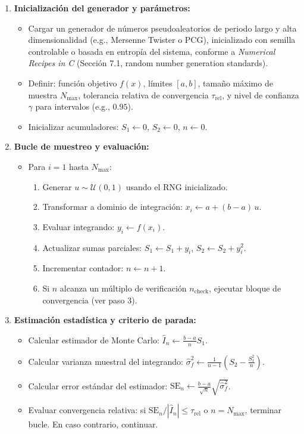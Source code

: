 \documentclass[12pt]{article}
\begin{document}
\begin{enumerate}
\item \textbf{Inicialización del generador y parámetros:}
\begin{itemize}
\item Cargar un generador de números pseudoaleatorios de periodo largo y alta dimensionalidad (e.g., Mersenne Twister o PCG), inicializado con semilla controlable o basada en entropía del sistema, conforme a \textit{Numerical Recipes in C} (Sección 7.1, random number generation standards).
\item Definir: función objetivo $f(x)$, límites $[a,b]$, tamaño máximo de muestra $N_{\max}$, tolerancia relativa de convergencia $\tau_{\text{rel}}$, y nivel de confianza $\gamma$ para intervalos (e.g., $0.95$).
\item Inicializar acumuladores: $S_1 \leftarrow 0$, $S_2 \leftarrow 0$, $n \leftarrow 0$.
\end{itemize}

\item \textbf{Bucle de muestreo y evaluación:}
\begin{itemize}
\item Para $i = 1$ hasta $N_{\max}$:
\begin{enumerate}
\item Generar $u \sim \mathcal{U}(0,1)$ usando el RNG inicializado.
\item Transformar a dominio de integración: $x_i \leftarrow a + (b-a) \, u$.
\item Evaluar integrando: $y_i \leftarrow f(x_i)$.
\item Actualizar sumas parciales: $S_1 \leftarrow S_1 + y_i$, $S_2 \leftarrow S_2 + y_i^2$.
\item Incrementar contador: $n \leftarrow n + 1$.
\item Si $n$ alcanza un múltiplo de verificación $n_{\text{check}}$, ejecutar bloque de convergencia (ver paso 3).
\end{enumerate}
\end{itemize}

\item \textbf{Estimación estadística y criterio de parada:}
\begin{itemize}
\item Calcular estimador de Monte Carlo: $\hat{I}_n \leftarrow \frac{b-a}{n} S_1$.
\item Calcular varianza muestral del integrando: $\hat{\sigma}^2_f \leftarrow \frac{1}{n-1} \left( S_2 - \frac{S_1^2}{n} \right)$.
\item Calcular error estándar del estimador: $\text{SE}_n \leftarrow \frac{b-a}{\sqrt{n}} \sqrt{\hat{\sigma}^2_f}$.
\item Evaluar convergencia relativa: si $\text{SE}_n / |\hat{I}_n| \leq \tau_{\text{rel}}$ o $n = N_{\max}$, terminar bucle. En caso contrario, continuar.
\end{itemize}


\end{enumerate}
\end{document}
